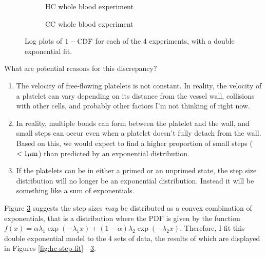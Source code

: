 \documentclass{article}
\newcommand{\tn}{\textnormal}
\begin{document}
\begin{figure}
\begin{subfigure}{0.48\textwidth}
    \caption{HC whole blood experiment}
    \label{fig:log-cdf-hcwhole}
  \end{subfigure}
  \hfill
  \begin{subfigure}{0.48\textwidth}
    \caption{CC whole blood experiment}
    \label{fig:log-cdf-ccwhole}
  \end{subfigure}
  \caption{Log plots of $1 - \tn{CDF}$ for each of the 4 experiments,
    with a double exponential fit.}
  \label{fig:semilogy-cdf}
\end{figure}

What are potential reasons for this discrepancy?
\begin{enumerate}
\item The velocity of free-flowing platelets is not constant. In
  reality, the velocity of a platelet can vary depending on its
  distance from the vessel wall, collisions with other cells, and
  probably other factors I'm not thinking of right now.
\item In reality, multiple bonds can form between the platelet and the
  wall, and small steps can occur even when a platelet doesn't fully
  detach from the wall. Based on this, we would expect to find a
  higher proportion of small steps ($< 1 \mu\tn{m}$) than predicted by
  an exponential distribution.
\item If the platelets can be in either a primed or an unprimed state,
  the step size distribution will no longer be an exponential
  distribution. Instead it will be something like a sum of
  exponentials.
\end{enumerate}

Figure \ref{fig:semilogy-cdf} suggests the step sizes \emph{may} be
distributed as a convex combination of exponentials, that is a
distribution where the PDF is given by the function $f(x) = \alpha
\lambda_1 \exp(-\lambda_1 x) + (1 - \alpha) \lambda_2 \exp(-\lambda_2
x).$ Therefore, I fit this double exponential model to the 4 sets of
data, the results of which are displayed in Figures
\ref{fig:hc-step-fit}---\ref{fig:semilogy-cdf}.
\end{document}
